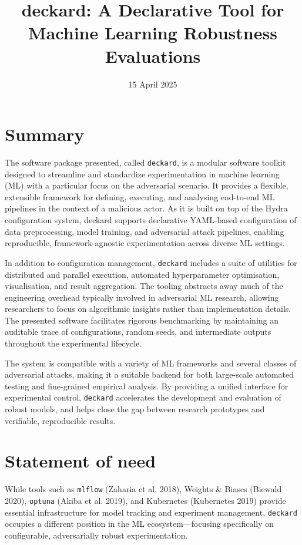 \documentclass[
]{article}
\title{deckard: A Declarative Tool for Machine Learning Robustness
Evaluations}
\author{}
\date{\vspace{-2.5em}15 April 2025}
\begin{document}
\maketitle

\hypertarget{summary}{%
\section{Summary}\label{summary}}

The software package presented, called \texttt{deckard}, is a modular
software toolkit designed to streamline and standardize experimentation
in machine learning (ML) with a particular focus on the adversarial
scenario. It provides a flexible, extensible framework for defining,
executing, and analysing end-to-end ML pipelines in the context of a
malicious actor. As it is built on top of the Hydra configuration
system, deckard supports declarative YAML-based configuration of data
preprocessing, model training, and adversarial attack pipelines,
enabling reproducible, framework-agnostic experimentation across diverse
ML settings.

In addition to configuration management, \texttt{deckard} includes a
suite of utilities for distributed and parallel execution, automated
hyperparameter optimisation, visualisation, and result aggregation. The
tooling abstracts away much of the engineering overhead typically
involved in adversarial ML research, allowing researchers to focus on
algorithmic insights rather than implementation details. The presented
software facilitates rigorous benchmarking by maintaining an auditable
trace of configurations, random seeds, and intermediate outputs
throughout the experimental lifecycle.

The system is compatible with a variety of ML frameworks and several
classes of adversarial attacks, making it a suitable backend for both
large-scale automated testing and fine-grained empirical analysis. By
providing a unified interface for experimental control, \texttt{deckard}
accelerates the development and evaluation of robust models, and helps
close the gap between research prototypes and verifiable, reproducible
results.

\hypertarget{statement-of-need}{%
\section{Statement of need}\label{statement-of-need}}

While tools such as \texttt{mlflow} (Zaharia et al. 2018), Weights \&
Biases (Biewald 2020), \texttt{optuna} (Akiba et al. 2019), and
Kubernetes (Kubernetes 2019) provide essential infrastructure for model
tracking and experiment management, \texttt{deckard} occupies a
different position in the ML ecosystem---focusing specifically on
configurable, adversarially robust experimentation.
\end{document}
